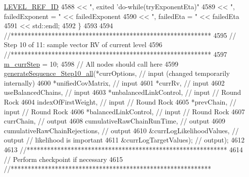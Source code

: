\begin{DoxyCode}
{{      \hyperlink{_m_l_sampling_level_options_8h_a68d15eaf394d210effcf584b938206d3}{LEVEL\_REF\_ID}
4588                               << \textcolor{stringliteral}{", exited 'do-while(tryExponentEta)"}
4589                               << \textcolor{stringliteral}{", failedExponent = "} << failedExponent
4590                               << \textcolor{stringliteral}{", failedEta = "}      << failedEta
4591                               << std::endl;
4592     \}
4593 
4594     \textcolor{comment}{//***********************************************************}
4595     \textcolor{comment}{// Step 10 of 11: sample vector RV of current level}
4596     \textcolor{comment}{//***********************************************************}
4597     \hyperlink{class_q_u_e_s_o_1_1_m_l_sampling_a1b1f8ccb4823bdfa26ec652f0807c63e}{m\_currStep} = 10;
4598     \textcolor{comment}{// All nodes should call here}
4599     \hyperlink{class_q_u_e_s_o_1_1_m_l_sampling_a04322fda4c97eee6c6739fc007d642c1}{generateSequence\_Step10\_all}(*currOptions,                 \textcolor{comment}{// input (changed
       temporarily internally)}
4600                                 *unifiedCovMatrix,            \textcolor{comment}{// input}
4601                                 *currRv,                      \textcolor{comment}{// input}
4602                                 useBalancedChains,            \textcolor{comment}{// input}
4603                                 *unbalancedLinkControl,       \textcolor{comment}{// input // Round Rock}
4604                                 indexOfFirstWeight,           \textcolor{comment}{// input // Round Rock}
4605                                 *prevChain,                   \textcolor{comment}{// input // Round Rock}
4606                                 *balancedLinkControl,         \textcolor{comment}{// input // Round Rock}
4607                                 currChain,                    \textcolor{comment}{// output}
4608                                 cumulativeRawChainRunTime,    \textcolor{comment}{// output}
4609                                 cumulativeRawChainRejections, \textcolor{comment}{// output}
4610                                 &currLogLikelihoodValues,     \textcolor{comment}{// output // likelihood is important}
4611                                 &currLogTargetValues);        \textcolor{comment}{// output);}
4612 
4613     \textcolor{comment}{//***********************************************************}
4614     \textcolor{comment}{// Perform checkpoint if necessary}
4615     \textcolor{comment}{//***********************************************************}
}}
\end{DoxyCode}
